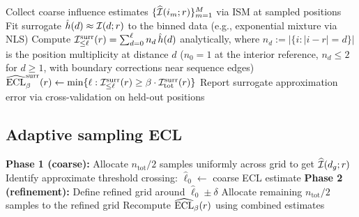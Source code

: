 \begin{algorithm}[H]
\caption{Fast ECL via surrogate models}\label{alg:surrogate}
\BlankLine
Collect coarse influence estimates $\{\widehat{\mathcal{I}}(i_m;r)\}_{m=1}^M$ via ISM at sampled positions\;
Fit surrogate $\hat{h}(d) \approx \mathcal{I}(d;r)$ to the binned data (e.g., exponential mixture via NLS)\;
Compute $\mathcal{I}_{\le \ell}^{\mathrm{surr}}(r) = \sum_{d=0}^\ell n_d\,\hat{h}(d)$ analytically, where $n_d := |\{i:|i-r|=d\}|$ is the position multiplicity at distance $d$ ($n_0 = 1$ at the interior reference, $n_d \le 2$ for $d \ge 1$, with boundary corrections near sequence edges)\;
$\widehat{\mathrm{ECL}}_\beta^{\mathrm{surr}}(r) \leftarrow \min\{\ell : \mathcal{I}_{\le \ell}^{\mathrm{surr}}(r) \ge \beta \cdot \mathcal{I}_{\mathrm{tot}}^{\mathrm{surr}}(r)\}$\;
Report surrogate approximation error via cross-validation on held-out positions\;
\end{algorithm}

\subsection{Adaptive sampling ECL}

\begin{algorithm}[H]
\caption{Adaptive sampling ECL estimator}\label{alg:adaptive}
\BlankLine
\textbf{Phase 1 (coarse):} Allocate $n_{\mathrm{tot}}/2$ samples uniformly across grid to get $\widehat{\mathcal{I}}(d_g;r)$\;
Identify approximate threshold crossing: $\hat{\ell}_0 \leftarrow$ coarse ECL estimate\;
\textbf{Phase 2 (refinement):} Define refined grid around $\hat{\ell}_0 \pm \delta$\;
Allocate remaining $n_{\mathrm{tot}}/2$ samples to the refined grid\;
Recompute $\widehat{\mathrm{ECL}}_\beta(r)$ using combined estimates\;
\end{algorithm}
